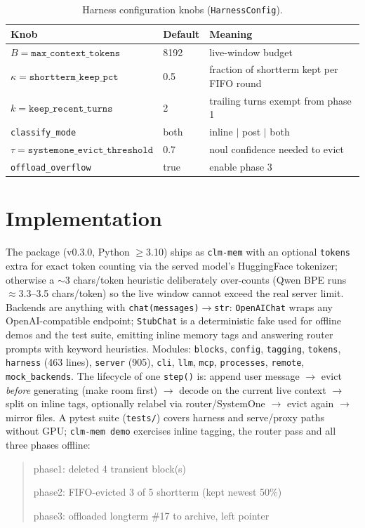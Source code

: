 \documentclass[10pt]{article}
\begin{document}
\begin{table}[h]
\centering\small
\begin{tabular}{lll}
\hline
Knob & Default & Meaning\\
\hline
$B=\texttt{max\_context\_tokens}$ & 8192 & live-window budget\\
$\kappa=\texttt{shortterm\_keep\_pct}$ & 0.5 & fraction of shortterm kept per FIFO round\\
$k=\texttt{keep\_recent\_turns}$ & 2 & trailing turns exempt from phase 1\\
\texttt{classify\_mode} & both & inline $\vert$ post $\vert$ both\\
$\tau=\texttt{systemone\_evict\_threshold}$ & 0.7 & noul confidence needed to evict\\
\texttt{offload\_overflow} & true & enable phase 3\\
\hline
\end{tabular}
\caption{Harness configuration knobs (\texttt{HarnessConfig}).}\label{tab:knobs}
\end{table}

\section{Implementation}
The package (v0.3.0, Python $\geq$3.10) ships as \texttt{clm-mem} with an optional \texttt{tokens} extra for exact token counting via the served model's HuggingFace tokenizer; otherwise a $\sim$3 chars/token heuristic deliberately over-counts (Qwen BPE runs $\approx$3.3--3.5 chars/token) so the live window cannot exceed the real server limit. Backends are anything with \texttt{chat(messages)$\to$str}: \texttt{OpenAIChat} wraps any OpenAI-compatible endpoint; \texttt{StubChat} is a deterministic fake used for offline demos and the test suite, emitting inline memory tags and answering router prompts with keyword heuristics. Modules: \texttt{blocks}, \texttt{config}, \texttt{tagging}, \texttt{tokens}, \texttt{harness} (463 lines), \texttt{server} (905), \texttt{cli}, \texttt{llm}, \texttt{mcp}, \texttt{processes}, \texttt{remote}, \texttt{mock\_backends}. The lifecycle of one \texttt{step()} is: append user message $\to$ evict \emph{before} generating (make room first) $\to$ decode on the current live context $\to$ split on inline tags, optionally relabel via router/SystemOne $\to$ evict again $\to$ mirror files. A pytest suite (\texttt{tests/}) covers harness and serve/proxy paths without GPU; \texttt{clm-mem demo} exercises inline tagging, the router pass and all three phases offline:
\begin{quote}\small\ttfamily
[evict] phase1: deleted 4 transient block(s)\par
[evict] phase2: FIFO-evicted 3 of 5 shortterm (kept newest 50\%)\par
[evict] phase3: offloaded longterm \#17 to archive, left pointer
\end{quote}
\end{document}
